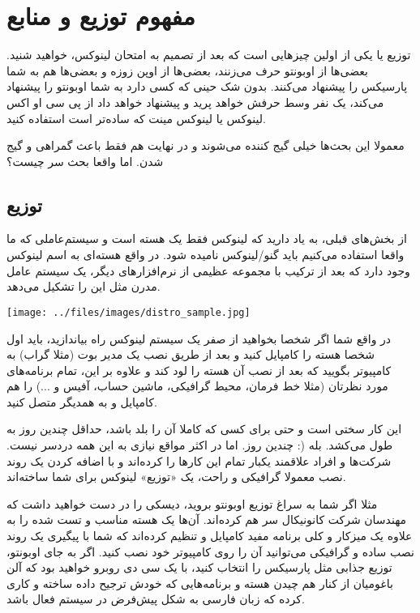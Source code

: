 \section{مفهوم توزیع و منابع}

توزیع یا 
یکی از اولین چیزهایی است که بعد از تصمیم به امتحان لینوکس، خواهید شنید. بعضی‌ها از اوبونتو حرف می‌زنند، بعضی‌ها از اوپن زوزه و بعضی‌ها هم به شما پارسیکس را پیشنهاد می‌کنند. بدون شک حینی که کسی دارد به شما اوبونتو را پیشنهاد می‌کند، یک نفر وسط حرفش خواهد پرید و پیشنهاد خواهد داد از پی سی او اکس لینوکس یا لینوکس مینت که ساده‌تر است استفاده کنید.

معمولا این بحث‌ها خیلی گیج کننده می‌شوند و در نهایت هم فقط باعث گمراهی و گیج شدن. اما واقعا بحث سر چیست؟
\subsection*{توزیع}
از بخش‌های قبلی، به یاد دارید که لینوکس فقط یک هسته است و سیستم‌عاملی که ما واقعا استفاده می‌کنیم باید گنو/لینوکس نامیده شود. در واقع هسته‌ای به اسم لینوکس وجود دارد که بعد از ترکیب با مجموعه عظیمی از نرم‌افزارهای دیگر، یک سیستم عامل مدرن مثل این را تشکیل می‌دهد.

\texttt{[image: ../files/images/distro\_sample.jpg]}

در واقع شما اگر شخصا بخواهید از صفر یک سیستم لینوکس راه بیاندازید، باید اول شخصا هسته را کامپایل کنید و بعد از طریق نصب یک مدیر بوت (مثلا گراب) به کامپیوتر بگویید که بعد از نصب آن هسته را لود کند و علاوه بر این، تمام برنامه‌های مورد نظرتان (مثلا خط فرمان، محیط گرافیکی، ماشین حساب، آفیس و ...) را هم کامپایل و به همدیگر متصل کنید.

این کار سختی است و حتی برای کسی که کاملا آن را بلد باشد، حداقل چندین روز به طول می‌کشد. بله (: چندین روز. اما در اکثر مواقع نیازی به این همه دردسر نیست. شرکت‌ها و افراد علاقمند یکبار تمام این کارها را کرده‌اند و با اضافه کردن یک روند نصب معمولا گرافیکی و راحت، یک «توزیع» لینوکس برای شما ساخته‌اند.

مثلا اگر شما به سراغ توزیع اوبونتو بروید، دیسکی را در دست خواهید داشت که مهندسان شرکت کانونیکال سر هم کرده‌اند. آن‌ها یک هسته مناسب و تست شده را به علاوه یک میزکار و کلی برنامه مفید کامپایل و تنظیم کرده‌اند که شما با پیگیری یک روند نصب ساده و گرافیکی می‌توانید آن را روی کامپیوتر خود نصب کنید.
اگر به جای اوبونتو، توزیع جذابی مثل پارسیکس را انتخاب کنید، با یک سی دی روبرو خواهید بود که آلن باغومیان از کنار هم چیدن هسته و برنامه‌هایی که خودش ترجیح داده ساخته و کاری کرده که زبان فارسی به شکل پیش‌فرض در سیستم فعال باشد.

